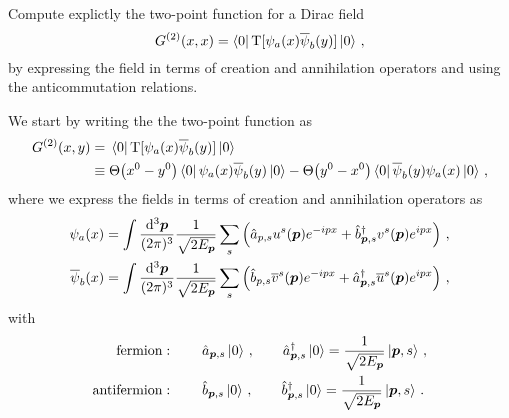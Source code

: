 \begin{ex} \label{ex_27} 
    Compute explictly the two-point function for a Dirac field
    \begin{equation}
        G^{(2)}(x, x) = \bra{0}\mathbf{\rm T}[\psi_{a}(x)\overline{\psi}_{b}(y)]\ket{0} \, ,  
    \end{equation}
    by expressing the field in terms of creation and annihilation operators and using the anticommutation relations.
\end{ex}


\begin{sol}
    We start by writing the the two-point function as
    \begin{equation}
    \begin{split}
        G^{(2)}(x, y) 
        = &\; \bra{0}\mathbf{\rm T}[\psi_{a}(x)\overline{\psi}_{b}(y)]\ket{0} \\
        \equiv &\; \Theta\big(x^0 - y^0\big) \bra{0} \psi_{a}(x)\overline{\psi}_{b}(y) \ket{0} - \Theta\big(y^0 - x^0\big) \bra{0} \overline{\psi}_{b}(y) \psi_{a}(x) \ket{0} \, ,
    \end{split}
    \end{equation}
    where we express the fields in terms of creation and annihilation operators as
    \begin{equation}
        \begin{split}
            \psi_{a}(x) &= \int \frac{{\rm d}^{3}\boldsymbol{p}}{(2\pi)^{3}} \frac{1}{\sqrt{2 E_{\boldsymbol{p}}}}\sum_{s}\left(\hat{a}_{p, s}u^{s}(\boldsymbol{p})e^{-ipx} + \hat{b}^\dagger_{\boldsymbol{p}, s}v^{s}(\boldsymbol{p})e^{ipx}\right) \,,\\
            \overline{\psi}_{b}(x) &= \int \frac{{\rm d}^{3}\boldsymbol{p}}{(2\pi)^{3}} \frac{1}{\sqrt{2 E_{\boldsymbol{p}}}}\sum_{s}\left(\hat{b}_{p, s}\overline{v}^{s}(\boldsymbol{p})e^{-ipx} + \hat{a}^\dagger_{\boldsymbol{p}, s}\overline{u}^{s}(\boldsymbol{p})e^{ipx}\right)\, ,
        \end{split}
    \end{equation}
    with 
    \begin{equation} \label{eq_crean_rel}
    \begin{split}
        \text{fermion}: &\; \qquad \ades_{\vp, s}\ket{0} \, , \qquad \acon_{\vp, s}\ket{0} = \frac{1}{\sqrt{2\Ep}}\ket{\vp, s}\, , \\
        \text{antifermion}: &\; \qquad \bdes_{\vp, s}\ket{0} \, , \qquad \bcon_{\vp, s}\ket{0} = \frac{1}{\sqrt{2\Ep}}\ket{\vp, s} \, . 
    \end{split}

\end{equation}
\end{sol}
